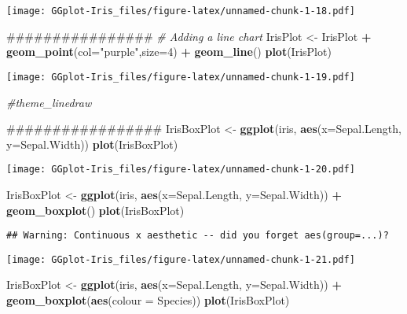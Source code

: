 \documentclass[]{article}
\newenvironment{Shaded}{\begin{snugshade}}{\end{snugshade}}
\newcommand{\KeywordTok}[1]{\textcolor[rgb]{0.13,0.29,0.53}{\textbf{#1}}}
\newcommand{\DataTypeTok}[1]{\textcolor[rgb]{0.13,0.29,0.53}{#1}}
\newcommand{\DecValTok}[1]{\textcolor[rgb]{0.00,0.00,0.81}{#1}}
\newcommand{\StringTok}[1]{\textcolor[rgb]{0.31,0.60,0.02}{#1}}
\newcommand{\CommentTok}[1]{\textcolor[rgb]{0.56,0.35,0.01}{\textit{#1}}}
\newcommand{\OperatorTok}[1]{\textcolor[rgb]{0.81,0.36,0.00}{\textbf{#1}}}
\newcommand{\NormalTok}[1]{#1}
\begin{document}
\texttt{[image: GGplot-Iris\_files/figure-latex/unnamed-chunk-1-18.pdf]}

\begin{Shaded}
\begin{Highlighting}[]
\NormalTok{################}
\CommentTok{# Adding a line chart}
\NormalTok{IrisPlot <-}\StringTok{ }\NormalTok{IrisPlot }\OperatorTok{+}\StringTok{  }\KeywordTok{geom_point}\NormalTok{(}\DataTypeTok{col=}\StringTok{"purple"}\NormalTok{,}\DataTypeTok{size=}\DecValTok{4}\NormalTok{) }\OperatorTok{+}\StringTok{ }\KeywordTok{geom_line}\NormalTok{()}
\KeywordTok{plot}\NormalTok{(IrisPlot)}
\end{Highlighting}
\end{Shaded}

\texttt{[image: GGplot-Iris\_files/figure-latex/unnamed-chunk-1-19.pdf]}

\begin{Shaded}
\begin{Highlighting}[]
\CommentTok{#theme_linedraw}

\NormalTok{#################}
\NormalTok{IrisBoxPlot  <-}\StringTok{ }\KeywordTok{ggplot}\NormalTok{(iris, }\KeywordTok{aes}\NormalTok{(}\DataTypeTok{x=}\NormalTok{Sepal.Length, }\DataTypeTok{y=}\NormalTok{Sepal.Width))}
\KeywordTok{plot}\NormalTok{(IrisBoxPlot)}
\end{Highlighting}
\end{Shaded}

\texttt{[image: GGplot-Iris\_files/figure-latex/unnamed-chunk-1-20.pdf]}

\begin{Shaded}
\begin{Highlighting}[]
\NormalTok{IrisBoxPlot  <-}\StringTok{ }\KeywordTok{ggplot}\NormalTok{(iris, }\KeywordTok{aes}\NormalTok{(}\DataTypeTok{x=}\NormalTok{Sepal.Length, }\DataTypeTok{y=}\NormalTok{Sepal.Width)) }\OperatorTok{+}\StringTok{ }\KeywordTok{geom_boxplot}\NormalTok{()}
\KeywordTok{plot}\NormalTok{(IrisBoxPlot)}
\end{Highlighting}
\end{Shaded}

\begin{verbatim}
## Warning: Continuous x aesthetic -- did you forget aes(group=...)?
\end{verbatim}

\texttt{[image: GGplot-Iris\_files/figure-latex/unnamed-chunk-1-21.pdf]}

\begin{Shaded}
\begin{Highlighting}[]
\NormalTok{IrisBoxPlot  <-}\StringTok{ }\KeywordTok{ggplot}\NormalTok{(iris, }\KeywordTok{aes}\NormalTok{(}\DataTypeTok{x=}\NormalTok{Sepal.Length, }\DataTypeTok{y=}\NormalTok{Sepal.Width)) }\OperatorTok{+}\StringTok{ }\KeywordTok{geom_boxplot}\NormalTok{(}\KeywordTok{aes}\NormalTok{(}\DataTypeTok{colour =}\NormalTok{ Species))}
\KeywordTok{plot}\NormalTok{(IrisBoxPlot)}
\end{Highlighting}
\end{Shaded}
\end{document}
